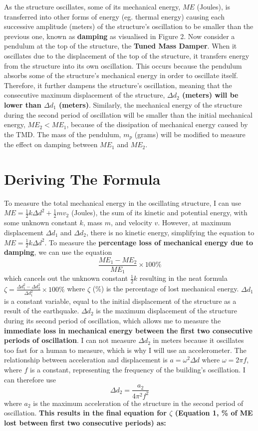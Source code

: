 \documentclass{article}
\begin{document}
As the structure oscillates, some of its mechanical energy, $ME$ (Joules), is transferred into other forms of energy (eg. thermal energy) causing each successive amplitude (meters) of the structure’s oscillation to be smaller than the previous one, known as\textbf{ damping }as visualised in Figure 2. Now consider a pendulum at the top of the structure, the \textbf{Tuned Mass Damper}. When it oscillates due to the displacement of the top of the structure, it transfers energy from the structure into its own oscillation. This occurs because the pendulum absorbs some of the structure's mechanical energy in order to oscillate itself. Therefore, it further dampens the structure’s oscillation, meaning that the consecutive maximum displacement of the structure, \textbf{$\Delta d_2$ (meters) will be lower than $\Delta d_1$ (meters)}. Similarly, the mechanical energy of the structure during the second period of oscillation will be smaller than the initial mechanical energy, $ME_2 < ME_1$, because of the dissipation of mechanical energy caused by the TMD. The mass of the pendulum, $m_p$ (grams) will be modified to measure the effect on damping between $ME_1$ and $ME_2$.

\section{Deriving The Formula}

To measure the total mechanical energy in the oscillating structure, I can use $ME=\frac{1}{2}k\Delta d ^2+\frac{1}{2}mv_2$ (Joules), the sum of its kinetic and potential energy, with some unknown constant $k$, mass $m$, and velocity $v$. However, at maximum displacement $\Delta d_1$ and $\Delta d_2$, there is no kinetic energy, simplifying the equation to $ME=\frac{1}{2}k \Delta d^2$. To measure the \textbf{percentage loss of mechanical energy due to damping}, we can use the equation $$\frac{ME_1-ME_2}{ME_1}\times100\%$$ which cancels out the unknown constant $\frac{1}{2}k$ resulting in the neat formula $\zeta=\frac{\Delta d_1^2-\Delta d_2^2}{\Delta d_1^2}\times100\%$ where $\zeta$ (\%) is the percentage of lost mechanical energy.
$\Delta d_1$ is a constant variable, equal to the initial displacement of the structure as a result of the earthquake. $\Delta d_2$ is the maximum displacement of the structure during its second period of oscillation, which allows me to measure the \textbf{immediate loss in mechanical energy between the first two consecutive periods of oscillation}. I can not measure $\Delta d_2$ in meters because it oscillates too fast for a human to measure, which is why I will use an accelerometer. The relationship between acceleration and displacement is $a=\omega ^2 \Delta d$ where $\omega=2\pi f$, where $f$ is a constant, representing the frequency of the building’s oscillation. I can therefore use $$\Delta d_2=\frac{a_2}{4\pi^2f^2}$$ where $a_2$ is the maximum acceleration of the structure in the second period of oscillation. \textbf{This results in the final equation for $\zeta$ (Equation 1, \% of ME lost between first two consecutive periods) as:} 
\end{document}
